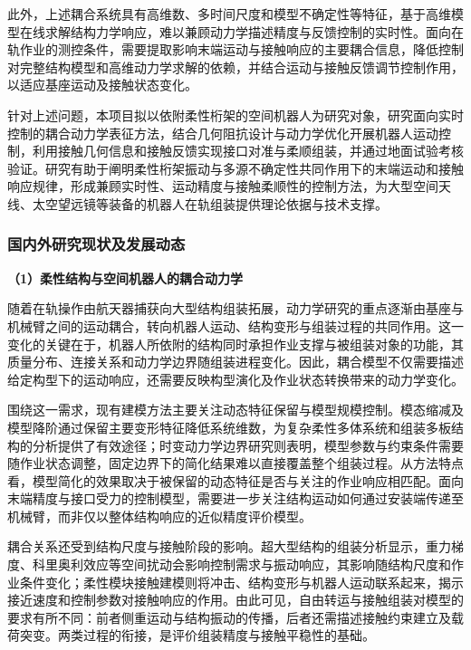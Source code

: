 \documentclass[UTF8,a4paper,zihao=-4,fontset=fandol]{ctexart}
\newcommand{\topic}[1]{\par\addvspace{0.5em}\noindent\textbf{#1}\par\nobreak}
\begin{document}
此外，上述耦合系统具有高维数、多时间尺度和模型不确定性等特征，基于高维模型在线求解结构力学响应，难以兼顾动力学描述精度与反馈控制的实时性。面向在轨作业的测控条件，需要提取影响末端运动与接触响应的主要耦合信息，降低控制对完整结构模型和高维动力学求解的依赖，并结合运动与接触反馈调节控制作用，以适应基座运动及接触状态变化。

针对上述问题，本项目拟以依附柔性桁架的空间机器人为研究对象，研究面向实时控制的耦合动力学表征方法，结合几何阻抗设计与动力学优化开展机器人运动控制，利用接触几何信息和接触反馈实现接口对准与柔顺组装，并通过地面试验考核验证。研究有助于阐明柔性桁架振动与多源不确定性共同作用下的末端运动和接触响应规律，形成兼顾实时性、运动精度与接触柔顺性的控制方法，为大型空间天线、太空望远镜等装备的机器人在轨组装提供理论依据与技术支撑。

\subsubsection{国内外研究现状及发展动态}

\topic{（1）柔性结构与空间机器人的耦合动力学}

随着在轨操作由航天器捕获向大型结构组装拓展，动力学研究的重点逐渐由基座与机械臂之间的运动耦合，转向机器人运动、结构变形与组装过程的共同作用\cite{hu2025,wu2024,papadopoulos2021}。这一变化的关键在于，机器人所依附的结构同时承担作业支撑与被组装对象的功能，其质量分布、连接关系和动力学边界随组装进程变化。因此，耦合模型不仅需要描述给定构型下的运动响应，还需要反映构型演化及作业状态转换带来的动力学变化。

围绕这一需求，现有建模方法主要关注动态特征保留与模型规模控制。模态缩减及模型降阶通过保留主要变形特征降低系统维数，为复杂柔性多体系统和组装多板结构的分析提供了有效途径\cite{sonneville2021,min2026}；时变动力学边界研究则表明，模型参数与约束条件需要随作业状态调整，固定边界下的简化结果难以直接覆盖整个组装过程\cite{ni2024}。从方法特点看，模型简化的效果取决于被保留的动态特征是否与关注的作业响应相匹配。面向末端精度与接口受力的控制模型，需要进一步关注结构运动如何通过安装端传递至机械臂，而非仅以整体结构响应的近似精度评价模型。

耦合关系还受到结构尺度与接触阶段的影响。超大型结构的组装分析显示，重力梯度、科里奥利效应等空间扰动会影响控制需求与振动响应，其影响随结构尺度和作业条件变化\cite{yang2023}；柔性模块接触建模则将冲击、结构变形与机器人运动联系起来，揭示接近速度和控制参数对接触响应的作用\cite{wucontact2026}。由此可见，自由转运与接触组装对模型的要求有所不同：前者侧重运动与结构振动的传播，后者还需描述接触约束建立及载荷突变。两类过程的衔接，是评价组装精度与接触平稳性的基础。
\end{document}
